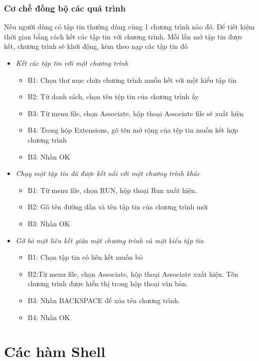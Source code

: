\documentclass[12pt,a4paper]{article}
\begin{document}
\subsubsection{Cơ chế đồng bộ các quá trình}
Nếu người dùng có tập tin thường dùng cùng 1 chương trình nào đó. Để tiết kiệm thời gian bằng cách kết các tập tin với chương trình. Mỗi lần mở tập tin được kết, chương trình sẽ khởi động, kèm theo nạp các tập tin đó\\
\begin{itemize}
	\item \textit{Kết các tập tin với một chương trình}
	\begin{itemize}
		\item [] B1: Chọn thư mục chứa chương trình muốn kết với một kiểu tập tin
		\item [] B2: Từ danh sách, chọn tên tệp tin của chương trình ấy
		\item [] B3: Từ menu file, chọn Associate, hộp thoại Associate file sẽ xuất hiện
		\item [] B4: Trong hộp Extensions, gõ tên mở rộng của tệp tin muốn kết hợp chương trình
		\item [] B3: Nhấn OK
	\end{itemize}
	\item \textit{Chạy một tập tin đã được kết nối với một chương trình khác}
		\begin{itemize}
		\item [] B1: Từ menu file, chọn RUN, hộp thoại Run xuất hiện.
		\item [] B2: Gõ tên đường dẫn và tên tập tin của chương trình mới
		\item [] B3: Nhấn OK
		\end{itemize}
	\item \textit{Gỡ bỏ một liên kết giữa một chương trình và một kiểu tập tin}
		\begin{itemize}
		\item [] B1: Chọn tập tin có liên kết muốn bỏ
		\item [] B2:Từ menu file, chọn Associate, hộp thoại Associate xuất hiện. Tên chương trình được hiển thị trong hộp thoại văn bản.
		\item [] B3: Nhấn BACKSPACE để xóa tên chương trình.
		\item [] B4: Nhấn OK
		\end{itemize}
\end{itemize}


\section{Các hàm Shell}
\end{document}
